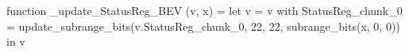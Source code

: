 function _update_StatusReg_BEV (v, x) = let v = { v with StatusReg_chunk_0 = update_subrange_bits(v.StatusReg_chunk_0, 22, 22, subrange_bits(x, 0, 0)) } in
  v
